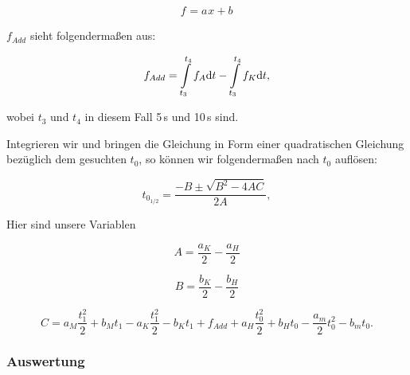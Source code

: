 \documentclass[11pt,a4paper]{article}
\begin{document}
\begin{equation}
f_{}=a_{}x+b_{}
\end{equation}

$f_{Add}$ sieht folgenderma\ss en aus:

\begin{equation}
f_{Add}=\int\displaylimits_{t_{3}}^{t_4}f_A\mathrm{d}t-\int\displaylimits_{t_{3}}^{t_4}f_K\mathrm{d}t,
\end{equation}

wobei $t_3$ und $t_4$ in diesem Fall 5\,s und 10\,s sind.

Integrieren wir und bringen die Gleichung in Form einer quadratischen Gleichung bez\"uglich dem gesuchten $t_0$, so k\"onnen wir folgenderma\ss en nach $t_0$ aufl\"osen:

\begin{equation}
t_{0_{1/2}}=\frac{-B\pm\sqrt{B^2-4AC}}{2A},\label{abc1}
\end{equation}

Hier sind unsere Variablen

\[
A=\frac{a_K}{2}-\frac{a_H}{2}
\]

\[
B=\frac{b_K}{2}-\frac{b_H}{2}
\]

\[
C=a_M\frac{t_1^2}{2}+b_Mt_1-a_K\frac{t_1^2}{2}-b_Kt_1+f_{Add}+a_H\frac{t_0^2}{2}+b_Ht_0-\frac{a_m}{2}t_0^2-b_mt_0.
\]

\subsubsection{Auswertung}


\end{document}
